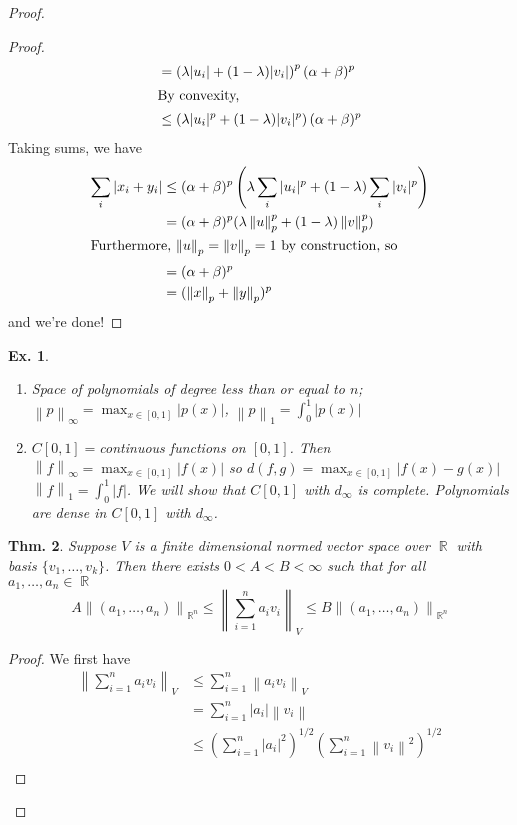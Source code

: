 \documentclass[12pt, a4paper]{book}
\DeclareMathOperator{\R}{\mathbb{R}}
\newcommand{\norm}[1]{\left\lVert#1\right\rVert} %
\newtheorem{theorem}{Thm.}[section]
\newtheorem{example}[theorem]{Ex.}
\theoremstyle{nonumberplain}
\newtheorem{proof}{Proof}
\begin{document}
\begin{proof}
\begin{proof}
\begin{align*}
        &= \left( \lambda|u_i|+(1-\lambda)|v_i| \right)^p(\alpha+\beta)^p\\
        \intertext{By convexity,}
        &\leq \left( \lambda|u_i|^p+(1-\lambda)|v_i|^p \right)(\alpha+\beta)^p
    \end{align*}
    Taking sums, we have
    \begin{align*}
        \sum\limits_i|x_i+y_i| &\leq (\alpha+\beta)^p\left( \lambda\sum\limits_i|u_i|^p+(1-\lambda)\sum\limits_i|v_i|^p \right)\\
        &= (\alpha+\beta)^p(\lambda\norm{u}_p^p+(1-\lambda)\norm{v}_p^p)\\
        \intertext{Furthermore, $\norm{u}_p=\norm{v}_p=1$ by construction, so}
        &= (\alpha+\beta)^p\\
        &= (\norm{x}_p+\norm{y}_p)^p
    \end{align*}
    and we're done!
\end{proof}
\begin{example}
    \begin{enumerate}
        \item Space of polynomials of degree less than or equal to $n$; $\norm{p}_\infty=\max_{x\in[0,1]}|p(x)|$,
            $\norm{p}_1=\int_0^1|p(x)|$
        \item $C[0,1]=$continuous functions on $[0,1]$. Then $\norm{f}_\infty=\max_{x\in[0,1]}|f(x)|$ so $d(f,g)=\max_{x\in[0,1]}|f(x)-g(x)|$
            $\norm{f}_1=\int_0^1|f|$. We will show that $C[0,1]$ with $d_\infty$ is complete. Polynomials are dense in $C[0,1]$ with
            $d_\infty$.
    \end{enumerate}
\end{example}
\begin{theorem}
    Suppose $V$ is a finite dimensional normed vector space over $\R$ with basis $\{v_1,\ldots,v_k\}$. Then there
    exists $0<A<B<\infty$ such that for all $a_1,\ldots,a_n\in\R$
    \[A\norm{(a_1,\ldots,a_n)}_{\R^n}\leq \norm{\sum\limits_{i=1}^na_iv_i}_V\leq B\norm{(a_1,\ldots,a_n)}_{\R^n}\]
\end{theorem}
\begin{proof}
    We first have
    \begin{align*}
        \norm{\sum\limits_{i=1}^na_iv_i}_V&\leq\sum\limits_{i=1}^n\norm{a_iv_i}_V\\
        &= \sum\limits_{i=1}^n|a_i|\norm{v_i}\\
        &\leq \left( \sum\limits_{i=1}^n|a_i|^2 \right)^{1/2}\left( \sum\limits_{i=1}^n\norm{v_i}^2 \right)^{1/2}\\

\end{align*}
\end{proof}
\end{proof}
\end{document}
